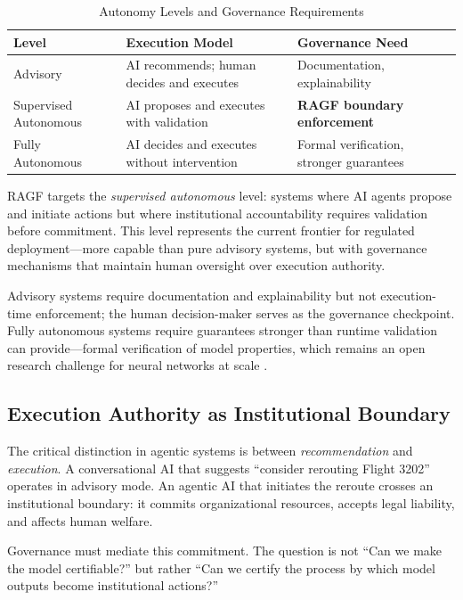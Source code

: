 \documentclass[sigconf,nonacm]{acmart}
\begin{document}
\begin{table}[htbp]
\caption{Autonomy Levels and Governance Requirements}
\label{tab:autonomy-levels}
\begin{tabular}{@{}p{2cm}p{2.5cm}p{2.5cm}@{}}
\toprule
\textbf{Level} & \textbf{Execution Model} & \textbf{Governance Need} \\
\midrule
Advisory & AI recommends; human decides and executes & Documentation, explainability \\
\addlinespace
Supervised Autonomous & AI proposes and executes with validation & \textbf{RAGF boundary enforcement} \\
\addlinespace
Fully Autonomous & AI decides and executes without intervention & Formal verification, stronger guarantees \\
\bottomrule
\end{tabular}
\end{table}

RAGF targets the \emph{supervised autonomous} level: systems where AI agents propose and initiate actions but where institutional accountability requires validation before commitment. This level represents the current frontier for regulated deployment---more capable than pure advisory systems, but with governance mechanisms that maintain human oversight over execution authority.

Advisory systems require documentation and explainability but not execution-time enforcement; the human decision-maker serves as the governance checkpoint. Fully autonomous systems require guarantees stronger than runtime validation can provide---formal verification of model properties, which remains an open research challenge for neural networks at scale \cite{katz2017reluplex}.

\subsection{Execution Authority as Institutional Boundary}

The critical distinction in agentic systems is between \emph{recommendation} and \emph{execution}. A conversational AI that suggests ``consider rerouting Flight 3202'' operates in advisory mode. An agentic AI that initiates the reroute crosses an institutional boundary: it commits organizational resources, accepts legal liability, and affects human welfare.

Governance must mediate this commitment. The question is not ``Can we make the model certifiable?'' but rather ``Can we certify the process by which model outputs become institutional actions?''
\end{document}
